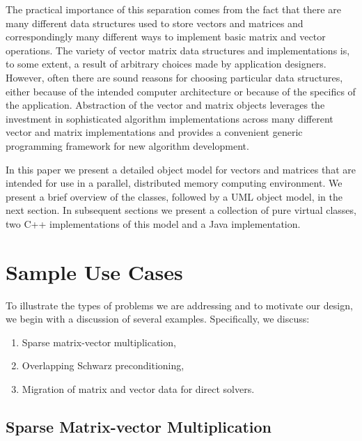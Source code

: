 \documentclass[10pt,relax]{PetraObjectModel}
\begin{document}
The practical importance of this separation comes from the fact
that there are many different data structures used to store
vectors and matrices and correspondingly many different ways
to implement basic matrix and vector operations.  The variety
of vector matrix data structures and implementations is, to
some extent, a result of arbitrary choices made by application
designers.  However, often there are sound reasons for choosing
particular data structures, either because of the intended
computer architecture or because of the specifics of the
application.  Abstraction of the vector and matrix objects
leverages the investment in sophisticated algorithm implementations
across many different vector and matrix implementations and
provides a convenient generic programming framework for new
algorithm development.

In this paper we present a detailed object model for vectors
and matrices that are intended for use in a parallel, distributed
memory computing environment.  We present a brief overview of
the classes, followed by a UML object model, in the next section.
In subsequent sections we present a collection of pure virtual
classes, two C++ implementations of this model and a Java
implementation.



\section{Sample Use Cases}

To illustrate the types of problems we are addressing and to motivate
our design, we begin with a discussion of several examples.
Specifically, we discuss:
\begin{enumerate}
\item Sparse matrix-vector multiplication,
\item Overlapping Schwarz preconditioning,
\item Migration of matrix and vector data for direct solvers.
\end{enumerate}

\subsection{Sparse Matrix-vector Multiplication}
\end{document}
